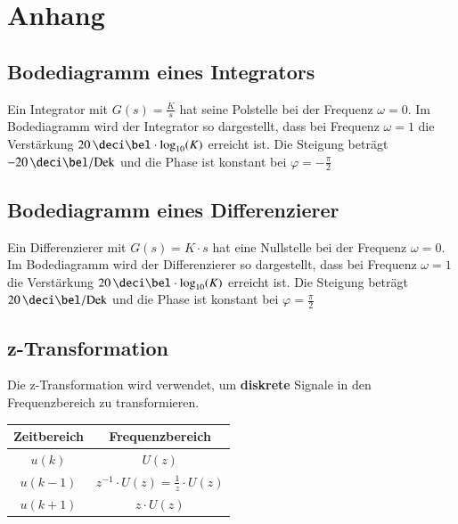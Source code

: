 \section{Anhang}

\subsection{Bodediagramm eines Integrators}
\label{Bodediagramm eines Integrators}

Ein Integrator mit $G(s) = \frac{K}{s}$ hat seine Polstelle bei der Frequenz $\omega = 0$. Im Bodediagramm wird der Integrator so
dargestellt, dass bei Frequenz $\omega = 1$ die Verstärkung $20 \, \deci \bel \cdot \log_{10}(K)$ erreicht ist. 
Die Steigung beträgt $-20 \, \deci \bel / \mathrm{Dek}$ und die Phase ist konstant bei $\varphi = -\frac{\pi}{2}$

 


\subsection{Bodediagramm eines Differenzierer}

Ein Differenzierer mit $G(s) = K \cdot s$ hat eine Nullstelle bei der Frequenz $\omega = 0$. Im Bodediagramm wird der Differenzierer so
dargestellt, dass bei Frequenz $\omega = 1$ die Verstärkung $20 \, \deci \bel \cdot \log_{10}(K)$ erreicht ist.
Die Steigung beträgt $20 \, \deci \bel / \mathrm{Dek}$ und die Phase ist konstant bei $\varphi = \frac{\pi}{2}$

 


\subsection{z-Transformation}
\label{z-Transformation}

Die z-Transformation wird verwendet, um \textbf{diskrete} Signale in den Frequenzbereich zu transformieren.

\renewcommand{\arraystretch}{1}

\begin{center}
    \begin{tabular}{c c}
        \toprule
        \textbf{Zeitbereich}    & \textbf{Frequenzbereich}  \\
        \toprule
        \strut$u(k)$                  & $U(z)$                    \\
        \strut$u(k-1)$                & $z^{-1} \cdot U(z) = \frac{1}{z} \cdot U(z)$ \\
        \strut$u(k+1)$                & $z \cdot U(z)$\\
        \bottomrule
    \end{tabular}
\end{center}


